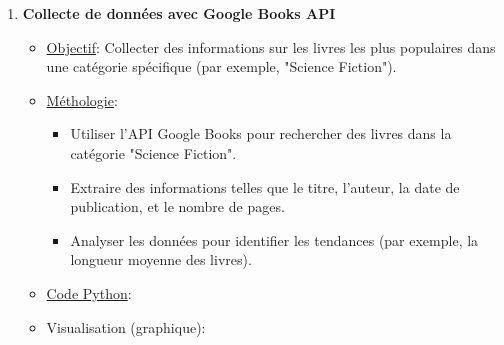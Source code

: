 \documentclass[a4paper,11pt]{article}
\begin{document}
            \newpage
            \begin{enumerate}
                \item \textbf{Collecte de données avec Google Books API}
                    \begin{itemize}
                        \item \underline{Objectif}: Collecter des informations sur les livres les plus populaires dans une catégorie spécifique (par exemple, "Science Fiction").
                        \item \underline{Méthologie}: 
                            \begin{itemize}
                                \item Utiliser l'API Google Books pour rechercher des livres dans la catégorie "Science Fiction".
                                \item Extraire des informations telles que le titre, l'auteur, la date de publication, et le nombre de pages.
                                \item Analyser les données pour identifier les tendances (par exemple, la longueur moyenne des livres).
                            \end{itemize}
                        \item \underline{Code Python}: 
                            
                        \newpage
                        \item Visualisation (graphique):
                            \begin{figure}[ht]
                            \end{figure}
                    \end{itemize}


\end{enumerate}
\end{document}
